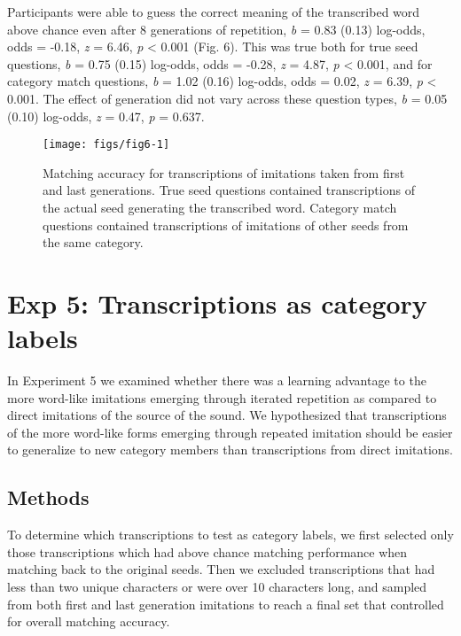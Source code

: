 \documentclass[10pt,letterpaper]{article}
\begin{document}
Participants were able to guess the correct meaning of the transcribed
word above chance even after 8 generations of repetition, \emph{b} =
0.83 (0.13) log-odds, odds = -0.18, \emph{z} = 6.46, \emph{p}
\textless{} 0.001 (Fig. 6). This was true both for true seed questions,
\emph{b} = 0.75 (0.15) log-odds, odds = -0.28, \emph{z} = 4.87, \emph{p}
\textless{} 0.001, and for category match questions, \emph{b} = 1.02
(0.16) log-odds, odds = 0.02, \emph{z} = 6.39, \emph{p} \textless{}
0.001. The effect of generation did not vary across these question
types, \emph{b} = 0.05 (0.10) log-odds, \emph{z} = 0.47, \emph{p} =
0.637.

\begin{figure}
\texttt{[image: figs/fig6-1]} \caption{Matching accuracy for transcriptions of imitations taken from first and last generations. True seed questions contained transcriptions of the actual seed generating the transcribed word. Category match questions contained transcriptions of imitations of other seeds from the same category.}\label{fig:fig6}
\end{figure}

\section{Exp 5: Transcriptions as category
labels}\label{exp-5-transcriptions-as-category-labels}

In Experiment 5 we examined whether there was a learning advantage to
the more word-like imitations emerging through iterated repetition as
compared to direct imitations of the source of the sound. We
hypothesized that transcriptions of the more word-like forms emerging
through repeated imitation should be easier to generalize to new
category members than transcriptions from direct imitations.

\subsection{Methods}\label{methods-4}

To determine which transcriptions to test as category labels, we first
selected only those transcriptions which had above chance matching
performance when matching back to the original seeds. Then we excluded
transcriptions that had less than two unique characters or were over 10
characters long, and sampled from both first and last generation
imitations to reach a final set that controlled for overall matching
accuracy.
\end{document}
